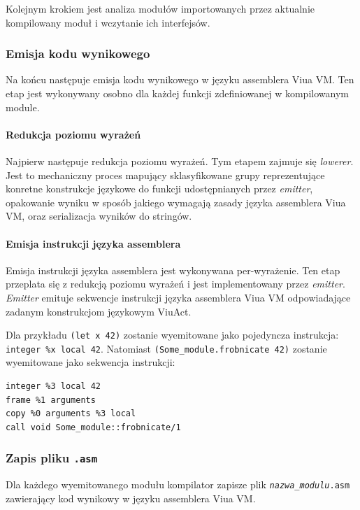 \documentclass[11pt,oneside,a4paper,titlepage,onecolumn]{article}
\begin{document}
Kolejnym krokiem jest analiza modułów importowanych przez aktualnie kompilowany moduł i wczytanie ich
interfejsów.

\subsubsection{Emisja kodu wynikowego}

Na końcu następuje emisja kodu wynikowego w języku assemblera Viua VM. Ten etap jest wykonywany osobno dla
każdej funkcji zdefiniowanej w kompilowanym module.

\paragraph{Redukcja poziomu wyrażeń}

Najpierw następuje redukcja poziomu wyrażeń. Tym etapem zajmuje się \emph{lowerer}. Jest to mechaniczny proces
mapujący sklasyfikowane grupy reprezentujące konretne konstrukcje językowe do funkcji udostępnianych przez
\emph{emitter}, opakowanie wyniku w sposób jakiego wymagają zasady języka assemblera Viua VM, oraz
serializacja wyników do stringów.

\paragraph{Emisja instrukcji języka assemblera}

Emisja instrukcji języka assemblera jest wykonywana per-wyrażenie. Ten etap przeplata się z redukcją poziomu
wyrażeń i jest implementowany przez \emph{emitter}. \emph{Emitter} emituje sekwencje instrukcji języka
assemblera Viua VM odpowiadające zadanym konstrukcjom językowym ViuAct.

Dla przykładu \texttt{(let x 42)} zostanie wyemitowane jako pojedyncza instrukcja: \texttt{integer \%x local
42}.  Natomiast \texttt{(Some\_module.frobnicate 42)} zostanie wyemitowane jako sekwencja instrukcji:

\begin{lstlisting}
integer %3 local 42
frame %1 arguments
copy %0 arguments %3 local
call void Some_module::frobnicate/1
\end{lstlisting}

\subsubsection{Zapis pliku \texttt{.asm}}

Dla każdego wyemitowanego modułu kompilator zapisze plik \texttt{\emph{nazwa\_modulu}.asm} zawierający kod
wynikowy w języku assemblera Viua VM.
\end{document}
